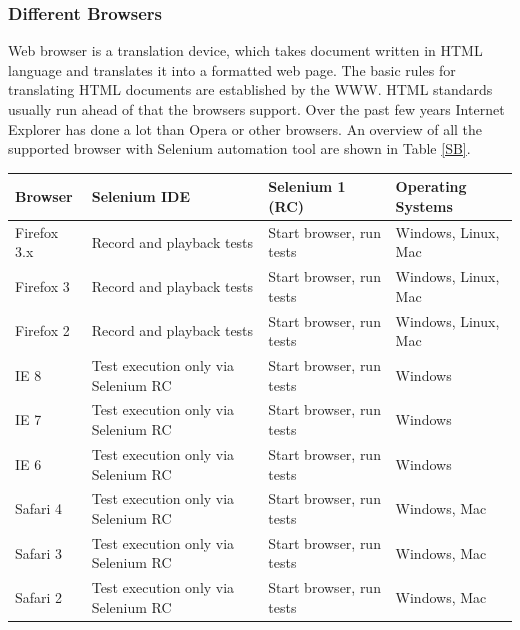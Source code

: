 \documentclass[article,type=msc,colorback,accentcolor=tud9c,twoside,11pt]{tudthesis}
\begin{document}
\subsubsection{Different Browsers}
Web browser is a translation device, which takes document written in HTML language and translates it into a formatted web page. The basic rules for translating HTML documents are established by the WWW. HTML standards usually run ahead of that the browsers support. Over the past few years Internet Explorer has done a lot than Opera or other browsers. An overview of all the supported browser with Selenium automation tool are shown in Table \ref{SB}.
\begin{table}[H]
\centering
\begin{tabular}{|l|l|l|l|}
	\hline
	\textbf{Browser} & \textbf{Selenium IDE} & \textbf{Selenium 1 (RC)} 
	& \textbf{Operating Systems}\\ \hline
	Firefox 3.x   & Record and playback tests             & Start browser, run tests  & Windows, Linux, Mac    \\ \hline
	
	Firefox 3  & Record and playback tests             & Start browser, run tests  & Windows, Linux, Mac    \\ \hline
	
	Firefox 2  & Record and playback tests             & Start browser, run tests  & Windows, Linux, Mac    \\ \hline
	
	IE 8  & Test execution only via Selenium RC             & Start browser, run tests  & Windows    \\ \hline
	
	IE 7  & Test execution only via Selenium RC             & Start browser, run tests  & Windows    \\ \hline
	
	IE 6  & Test execution only via Selenium RC             & Start browser, run tests  & Windows    \\ \hline
	
	Safari 4  & Test execution only via Selenium RC             & Start browser, run tests  & Windows, Mac    \\ \hline
	
	Safari 3  & Test execution only via Selenium RC             & Start browser, run tests  & Windows, Mac    \\ \hline
	
	Safari 2  & Test execution only via Selenium RC             & Start browser, run tests  & Windows, Mac    \\ \hline
	

\end{tabular}
\end{table}
\end{document}
